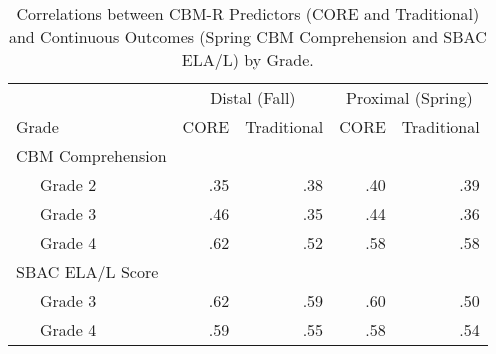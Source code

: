 \documentclass[
  english,
  man, fleqn, noextraspace]{apa6}
\begin{document}
\begin{table}[tbp]

\begin{center}
\begin{threeparttable}

\caption{\label{tab:tbl-cor}Correlations between CBM-R Predictors (CORE and Traditional) and Continuous Outcomes (Spring CBM Comprehension and SBAC ELA/L) by Grade.}

\begin{tabular}{lrrrr}
\toprule
 & \multicolumn{2}{c}{Distal (Fall)} & \multicolumn{2}{c}{Proximal (Spring)} \\
\cmidrule(r){2-3} \cmidrule(r){4-5}
Grade & \multicolumn{1}{c}{CORE} & \multicolumn{1}{c}{Traditional} & \multicolumn{1}{c}{CORE} & \multicolumn{1}{c}{Traditional}\\
\midrule
CBM Comprehension &  &  &  & \\
\ \ \ Grade 2 & .35 & .38 & .40 & .39\\
\ \ \ Grade 3 & .46 & .35 & .44 & .36\\
\ \ \ Grade 4 & .62 & .52 & .58 & .58\\
SBAC ELA/L Score &  &  &  & \\
\ \ \ Grade 3 & .62 & .59 & .60 & .50\\
\ \ \ Grade 4 & .59 & .55 & .58 & .54\\
\bottomrule
\end{tabular}

\end{threeparttable}
\end{center}

\end{table}
\end{document}

